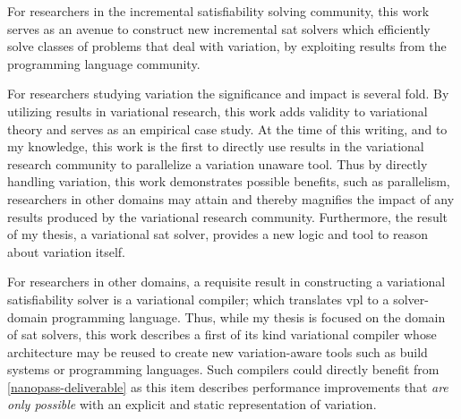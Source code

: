 For researchers in the incremental satisfiability solving community, this work
serves as an avenue to construct new incremental \ac{sat} solvers which
efficiently solve classes of problems that deal with variation, by exploiting
results from the programming language community.

For researchers studying variation the significance and impact is several fold.
By utilizing results in variational research, this work adds validity to
variational theory and serves as an empirical case study. At the time of this
writing, and to my knowledge, this work is the first to directly use results in
the variational research community to parallelize a variation unaware tool. Thus
by directly handling variation, this work demonstrates possible benefits, such
as parallelism, researchers in other domains may attain and thereby magnifies
the impact of any results produced by the variational research community.
Furthermore, the result of my thesis, a variational \ac{sat} solver, provides a
new logic and tool to reason about variation itself.

For researchers in other domains, a requisite result in constructing a
variational satisfiability solver is a variational compiler; which translates
\ac{vpl} to a solver-domain programming language. Thus, while my thesis is
focused on the domain of \ac{sat} solvers, this work describes a first of its
kind variational compiler whose architecture may be reused to create new
variation-aware tools such as build systems or programming languages. Such
compilers could directly benefit from \autoref{nanopass-deliverable} as this
item describes performance improvements that \emph{are only possible} with an
explicit and static representation of variation.

